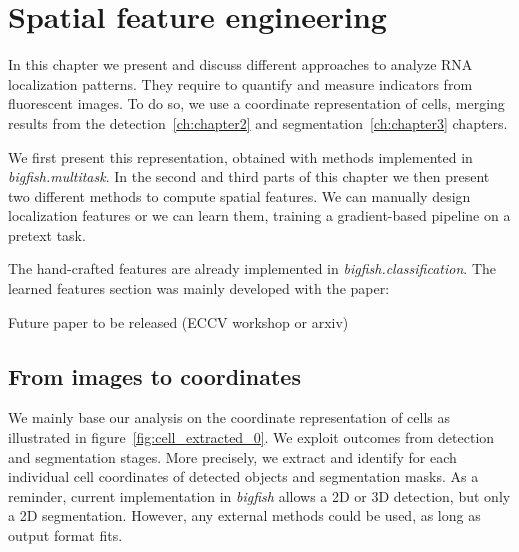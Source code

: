 
\graphicspath{{./figures/chapter4/}}


\chapter{Spatial feature engineering} \label{ch:chapter4}
\minitoc
\newpage

In this chapter we present and discuss different approaches to analyze \ac{RNA} localization patterns.
They require to quantify and measure indicators from fluorescent images.
To do so, we use a coordinate representation of cells, merging results from the detection~\ref{ch:chapter2} and segmentation~\ref{ch:chapter3} chapters.

We first present this representation, obtained with methods implemented in \emph{bigfish.multitask}.
In the second and third parts of this chapter we then present two different methods to compute spatial features.
We can manually design localization features or we can learn them, training a gradient-based pipeline on a pretext task.

The hand-crafted features are already implemented in \emph{bigfish.classification}.
The learned features section was mainly developed with the paper:

\begin{center}
	\color{green}
	Future paper to be released (ECCV workshop or arxiv)
\end{center}

\section{From images to coordinates} \label{sec:image_coordinates}

We mainly base our analysis on the coordinate representation of cells as illustrated in figure~\ref{fig:cell_extracted_0}.
We exploit outcomes from detection and segmentation stages.
More precisely, we extract and identify for each individual cell coordinates of detected objects and segmentation masks.
As a reminder, current implementation in \emph{bigfish} allows a 2D or 3D detection, but only a 2D segmentation.
However, any external methods could be used, as long as output format fits.

